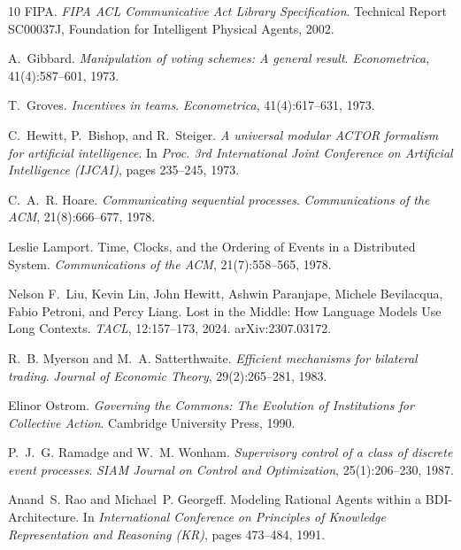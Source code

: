 \documentclass[11pt,a4paper]{article}
\begin{document}
\begin{thebibliography}{10}
FIPA.
\newblock \emph{FIPA ACL Communicative Act Library Specification}.
\newblock Technical Report SC00037J, Foundation for Intelligent Physical Agents, 2002.

A.~Gibbard.
\newblock \emph{Manipulation of voting schemes: A general result}.
\newblock \emph{Econometrica}, 41(4):587--601, 1973.

T.~Groves.
\newblock \emph{Incentives in teams}.
\newblock \emph{Econometrica}, 41(4):617--631, 1973.

C.~Hewitt, P.~Bishop, and R.~Steiger.
\newblock \emph{A universal modular ACTOR formalism for artificial intelligence}.
\newblock In \emph{Proc. 3rd International Joint Conference on Artificial Intelligence (IJCAI)}, pages 235--245, 1973.

C.~A.~R. Hoare.
\newblock \emph{Communicating sequential processes}.
\newblock \emph{Communications of the ACM}, 21(8):666--677, 1978.

Leslie Lamport.
\newblock Time, Clocks, and the Ordering of Events in a Distributed System.
\newblock \textit{Communications of the ACM}, 21(7):558--565, 1978.

Nelson F.\ Liu, Kevin Lin, John Hewitt, Ashwin Paranjape, Michele Bevilacqua, Fabio Petroni, and Percy Liang.
\newblock Lost in the Middle: How Language Models Use Long Contexts.
\newblock \textit{TACL}, 12:157--173, 2024. arXiv:2307.03172.

R.~B. Myerson and M.~A. Satterthwaite.
\newblock \emph{Efficient mechanisms for bilateral trading}.
\newblock \emph{Journal of Economic Theory}, 29(2):265--281, 1983.

Elinor Ostrom.
\newblock \textit{Governing the Commons: The Evolution of Institutions for Collective Action}.
\newblock Cambridge University Press, 1990.

P.~J.~G. Ramadge and W.~M. Wonham.
\newblock \emph{Supervisory control of a class of discrete event processes}.
\newblock \emph{SIAM Journal on Control and Optimization}, 25(1):206--230, 1987.

Anand~S. Rao and Michael~P. Georgeff.
\newblock Modeling Rational Agents within a BDI-Architecture.
\newblock In \textit{International Conference on Principles of Knowledge Representation and Reasoning (KR)}, pages 473--484, 1991.


\end{thebibliography}
\end{document}
